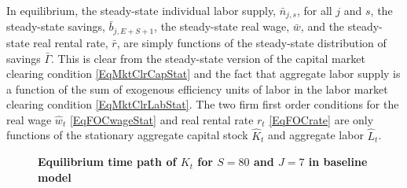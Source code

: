 \documentclass[letterpaper,12pt]{article}
\theoremstyle{definition}
\begin{document}
  In equilibrium, the steady-state individual labor supply, $\bar{n}_{j,s}$, for all $j$ and $s$, the steady-state savings, $\bar{b}_{j,E+S+1}$, the steady-state real wage, $\bar{w}$, and the steady-state real rental rate, $\bar{r}$, are simply functions of the steady-state distribution of savings $\bar{\Gamma}$. This is clear from the steady-state version of the capital market clearing condition \eqref{EqMktClrCapStat} and the fact that aggregate labor supply is a function of the sum of exogenous efficiency units of labor in the labor market clearing condition \eqref{EqMktClrLabStat}. The two firm first order conditions for the real wage $\hat{w}_t$ \eqref{EqFOCwageStat} and real rental rate $r_t$ \eqref{EqFOCrate} are only functions of the stationary aggregate capital stock $\hat{K}_t$ and aggregate labor $\hat{L}_t$.

  \begin{figure}[htb]\centering \captionsetup{width=4.0in}
    \caption{\label{FigKpathTPI}\textbf{Equilibrium time path of $K_t$ for $S=80$ and $J=7$ in baseline model}}
  \end{figure}
\end{document}
